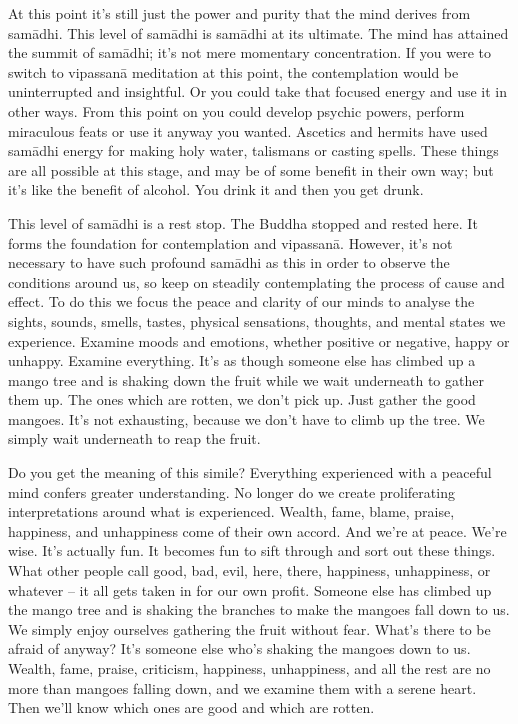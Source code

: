 At this point it's still just the power and purity that the mind derives from sam\=adhi. This level of sam\=adhi is sam\=adhi at its ultimate. The mind has attained the summit of sam\=adhi; it's not mere momentary concentration. If you were to switch to vipassan\=a meditation at this point, the contemplation would be uninterrupted and insightful. Or you could take that focused energy and use it in other ways. From this point on you could develop psychic powers, perform miraculous feats or use it anyway you wanted. Ascetics and hermits have used sam\=adhi energy for making holy water, talismans or casting spells. These things are all possible at this stage, and may be of some benefit in their own way; but it's like the benefit of alcohol. You drink it and then you get drunk. 

This level of sam\=adhi is a rest stop. The Buddha stopped and rested here. It forms the foundation for contemplation and vipassan\=a. However, it's not necessary to have such profound sam\=adhi as this in order to observe the conditions around us, so keep on steadily contemplating the process of cause and effect. To do this we focus the peace and clarity of our minds to analyse the sights, sounds, smells, tastes, physical sensations, thoughts, and mental states we experience. Examine moods and emotions, whether positive or negative, happy or unhappy. Examine everything. It's as though someone else has climbed up a mango tree and is shaking down the fruit while we wait underneath to gather them up. The ones which are rotten, we don't pick up. Just gather the good mangoes. It's not exhausting, because we don't have to climb up the tree. We simply wait underneath to reap the fruit.

Do you get the meaning of this simile? Everything experienced with a peaceful mind confers greater understanding. No longer do we create proliferating interpretations around what is experienced. Wealth, fame, blame, praise, happiness, and unhappiness come of their own accord. And we're at peace. We're wise. It's actually fun. It becomes fun to sift through and sort out these things. What other people call good, bad, evil, here, there, happiness, unhappiness, or whatever -- it all gets taken in for our own profit. Someone else has climbed up the mango tree and is shaking the branches to make the mangoes fall down to us. We simply enjoy ourselves gathering the fruit without fear. What's there to be afraid of anyway? It's someone else who's shaking the mangoes down to us. Wealth, fame, praise, criticism, happiness, unhappiness, and all the rest are no more than mangoes falling down, and we examine them with a serene heart. Then we'll know which ones are good and which are rotten.

